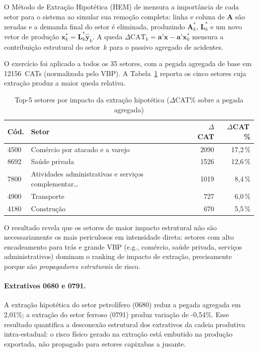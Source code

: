 \documentclass[12pt, a4paper]{article}
\begin{document}
  O Método de Extração Hipotética (HEM) de \citet{dietzenbacher2013expanding}
  mensura a importância de cada setor para o sistema ao simular sua
  remoção completa: linha e coluna de $\mathbf{A}$ são zeradas e a
  demanda final do setor é eliminada, produzindo
  $\mathbf{A}^*_k$, $\mathbf{L}^*_k$ e um novo vetor de produção
  $\mathbf{x}^*_k = \mathbf{L}^*_k \hat{\mathbf{y}}_k$.
  A queda $\Delta\text{CAT}_k = \mathbf{a}'\mathbf{x} - \mathbf{a}'\mathbf{x}^*_k$
  mensura a contribuição estrutural do setor~$k$ para o passivo agregado
  de acidentes.

  O exercício foi aplicado a todos os 35 setores, com a pegada
  agregada de base em 12156~CATs (normalizada pelo VBP).
  A Tabela~\ref{tab:hem_top5} reporta os cinco setores cuja extração
  produz a maior queda relativa.

  \begin{table}[H]
  \centering
  \small
  \caption{Top-5 setores por impacto da extração hipotética
  ($\Delta$CAT\% sobre a pegada agregada)}
  \label{tab:hem_top5}
  \begin{tabular}{lp{5.8cm}rr}
  \toprule
  \textbf{Cód.} & \textbf{Setor} & $\Delta$CAT & $\Delta$CAT\,\% \\
  \midrule
    4500 & Comércio por atacado e a varejo & 2090 & 17{,}2\,\% \\
8692 & Saúde privada & 1526 & 12{,}6\,\% \\
7800 & Atividades administrativas e serviços complementar\ldots & 1019 & 8{,}4\,\% \\
4900 & Transporte & 727 & 6{,}0\,\% \\
4180 & Construção & 670 & 5{,}5\,\% \\
  \bottomrule
  \end{tabular}
  \end{table}

  O resultado revela que os setores de maior impacto estrutural não
  são necessariamente os mais periculosos em intensidade direta: setores
  com alto encadeamento para trás e grande VBP (e.g., comércio, saúde
  privada, serviços administrativos) dominam o ranking de impacto de
  extração, precisamente porque são \textit{propagadores estruturais}
  de risco.

  \paragraph{Extrativos 0680 e 0791.}
  A extração hipotética do setor petrolífero (0680) reduz a pegada
  agregada em 2{,}01\%;
  a extração do setor ferroso (0791) produz variação de
  -0{,}54\%.
  Esse resultado quantifica a desconexão estrutural dos extrativos
  da cadeia produtiva intra-estadual: o risco físico gerado na extração
  está embutido na produção exportada, não propagado para setores
  capixabas a jusante.
\end{document}
